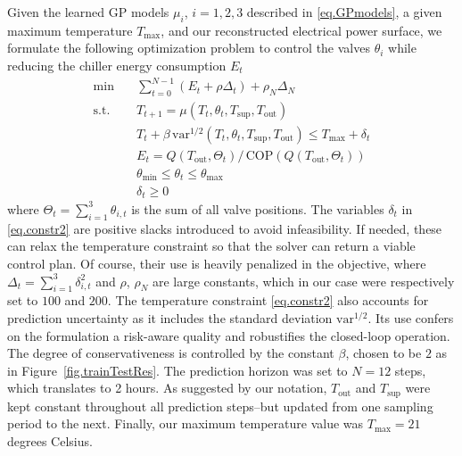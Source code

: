 Given the learned GP models $\mu_i$, $i=1,2,3$ described in \eqref{eq.GPmodels}, a given maximum temperature $T_{\max}$, and our reconstructed electrical power surface, we formulate the following optimization problem to control the valves $\theta_i$ while reducing the chiller energy consumption $E_t$
\begin{subequations}
	\begin{align}
		\min & \quad \sum_{t=0}^{N-1}  \left(E_t + \rho \Delta_t \right) + \rho_N \Delta_N\\
		\text{s.t.}
		& \quad T_{t+1} = \mu(T_t,\theta_t,T_{\text{sup}},T_{\text{out}}) \label{eq.constr1} \\
		& \quad T_t + \beta \, \text{var}^{1/2} (T_t,\theta_t,T_{\text{sup}},T_{\text{out}}) \leq T_\text{max} + \delta_t \label{eq.constr2} \\
		& \quad E_t = Q(T_\text{out},\Theta_t) / \, \text{COP}(Q(T_\text{out},\Theta_t)) \label{eq.constr3} \\
		& \quad \theta_{\text{min}} \leq \theta_t \leq \theta_{\text{max}} \label{eq.constr4} \\
		& \quad \delta_t \geq 0 \label{eq.constr5}
	\end{align}
	\label{eq.optControlProb}%
\end{subequations}
where $\Theta_t = \sum_{i=1}^{3} \theta_{i,t}$ is the sum of all valve positions. The variables $\delta_t$ in \eqref{eq.constr2} are positive slacks introduced to avoid infeasibility. If needed, these can relax the temperature constraint so that the solver can return a viable control plan. Of course, their use is heavily penalized in the objective, where $\Delta_t = \sum_{i=1}^{3} \delta_{i,t}^2$ and $\rho$, $\rho_N$ are large constants, which in our case were respectively set to $100$ and $200$. The temperature constraint \eqref{eq.constr2} also accounts for prediction uncertainty as it includes the standard deviation $\text{var}^{1/2}$. Its use confers on the formulation a risk-aware quality and robustifies the closed-loop operation. The degree of conservativeness is controlled by the constant $\beta$, chosen to be $2$ as in Figure~\ref{fig.trainTestRes}. The prediction horizon was set to $N=12$ steps, which translates to 2 hours. As suggested by our notation, $T_\text{out}$ and $T_\text{sup}$ were kept constant throughout all prediction steps--but updated from one sampling period to the next. Finally, our maximum temperature value was $T_{\max} = 21$ degrees Celsius.


